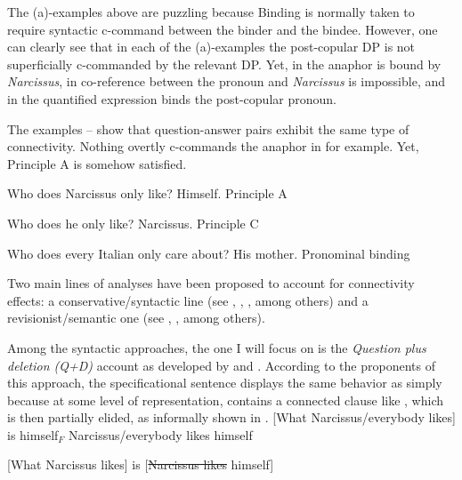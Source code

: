 \documentclass[output=paper,colorlinks,citecolor=brown,draft,draftmode]{langscibook}
\begin{document}
The (a)-examples above are puzzling because Binding is normally taken to require syntactic c-command between the binder and the bindee. However, one can clearly see that in each of the (a)-examples the post-copular DP is not superficially c-commanded by the relevant DP. Yet,  in  the anaphor is bound by \textit{Narcissus}, in  co-reference between the pronoun and \textit{Narcissus} is impossible, and in
  the quantified expression binds the post-copular pronoun.

 The examples -- show that question-answer pairs exhibit the same type of connectivity. Nothing overtly c-commands the anaphor in  for example. Yet, Principle A is somehow satisfied.


\ea \label{questans1}
\ea  Who does Narcissus only like? \ex  Himself. \hfill Principle A
\z
\z



\ea \ea  Who does he only like? \ex  Narcissus. \hfill Principle C
\z
\z


\ea \label{questans3}\ea  Who does every Italian only care about? \ex His mother.  \hfill Pronominal binding
\z
\z

Two main lines of analyses have been proposed to account for connectivity effects: a conservative/syntactic line (see \cite{ross1972act},  \cite{dendikkenal2000pseudocleftandellipsis}, \cite{schlenker2003clausalequation}, \cite{romero2007connectivityunified, romero2018connectivity}  among others) and a revisionist/semantic one  (see \cite{jacobson1994connectivitysalt}, \cite{sharvit1999connectivity}, \cite{cecchetto2000connectivity} among others). %

Among the syntactic approaches, the one I will focus on is the \textit{Question plus deletion (Q+D)} account as developed by \citet{schlenker2003clausalequation} and \citet{romero2007connectivityunified, romero2018connectivity}. According to the proponents of this approach, the specificational sentence  displays the same behavior as   simply because at some level of representation,  contains a connected clause like , which is then partially elided, as informally shown in .
\ea \ea \label{pseudocleft}[What Narcissus/everybody likes] is himself$_F$
\ex \label{simplesentence}Narcissus/everybody likes himself
\z
\z

\ea  \label{sottolineata} [What Narcissus likes] is [\sout{Narcissus likes} himself]
\z
\end{document}
